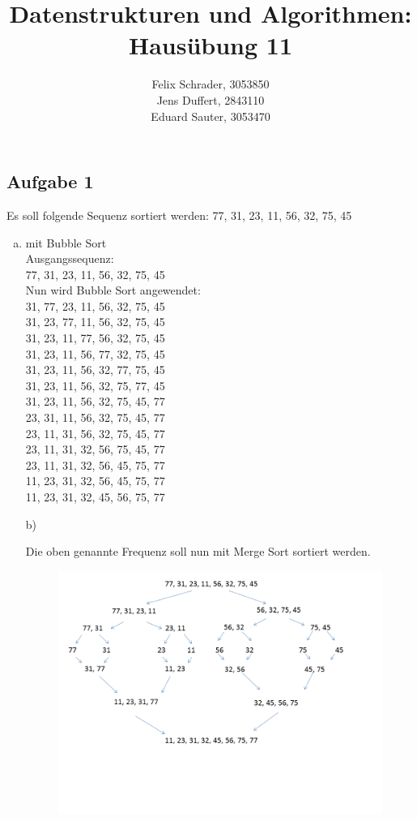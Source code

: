 \documentclass[11pt]{article}
\author{
  Felix Schrader, 3053850 \\ 
  Jens Duffert, 2843110 \\
  Eduard Sauter, 3053470
}
\title{Datenstrukturen und Algorithmen: Haus\"ubung 11}
\begin{document}
\maketitle


\subsection*{Aufgabe 1}
Es soll folgende Sequenz sortiert werden: 77, 31, 23, 11, 56, 32, 75, 45
\begin{enumerate}[a)]
    \item mit Bubble Sort\\
        Ausgangssequenz:\\
        77, 31, 23, 11, 56, 32, 75, 45\\
        Nun wird Bubble Sort angewendet:\\
        31, 77, 23, 11, 56, 32, 75, 45 \\
        31, 23, 77, 11, 56, 32, 75, 45 \\
        31, 23, 11, 77, 56, 32, 75, 45 \\
        31, 23, 11, 56, 77, 32, 75, 45 \\
        31, 23, 11, 56, 32, 77, 75, 45 \\
        31, 23, 11, 56, 32, 75, 77, 45 \\
        31, 23, 11, 56, 32, 75, 45, 77 \\
        23, 31, 11, 56, 32, 75, 45, 77 \\
        23, 11, 31, 56, 32, 75, 45, 77 \\
        23, 11, 31, 32, 56, 75, 45, 77 \\
        23, 11, 31, 32, 56, 45, 75, 77 \\
        11, 23, 31, 32, 56, 45, 75, 77 \\
        11, 23, 31, 32, 45, 56, 75, 77 \\


    \item[b)]

        Die oben genannte Frequenz soll nun mit Merge Sort sortiert werden.\\
        \begin{figure}
            \centering
            \includegraphics[width=0.7\linewidth]{aufgabeeins_b.png}

        \end{figure}


\end{enumerate}
\end{document}
